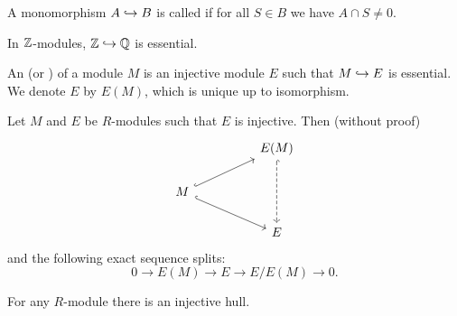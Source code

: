 \begin{definition*}
	A monomorphism \( A \hookrightarrow B \) is called  if for all \( S \in B \) we have \( A \cap S \neq 0 \).
\end{definition*}

\begin{example*}
	In \( \mathbb{Z} \)-modules, \( \mathbb{Z} \hookrightarrow \mathbb{Q} \) is essential.
\end{example*}

\begin{definition*}
	An  (or ) of a module \( M \) is an injective module \( E \) such that \( M \hookrightarrow E \) is essential. We denote \( E \) by \( E(M) \), which is unique up to isomorphism.
\end{definition*}

Let \( M \) and \( E \) be \( R \)-modules such that \( E \) is injective. Then (without proof)
\[
	\begin{tikzcd}
		&& {E(M)} \\
		M \\
		&& E
		\arrow[dashed, hook, from=1-3, to=3-3]
		\arrow[hook, from=2-1, to=1-3]
		\arrow[hook, from=2-1, to=3-3]
	\end{tikzcd}
\]
and the following exact sequence splits:
\[0 \to E(M) \to E \to E/E(M) \to 0.\]

\begin{theorem*}[w/o proof]
    For any \( R \)-module there is an injective hull.    
\end{theorem*}